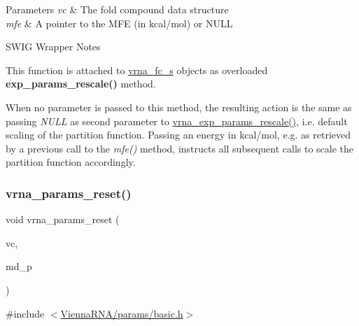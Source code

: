 \begin{DoxyParams}{Parameters}
{\em vc} & The fold compound data structure \\
\hline
{\em mfe} & A pointer to the M\+FE (in kcal/mol) or N\+U\+LL\\
\hline
\end{DoxyParams}
\begin{DoxyRefDesc}{S\+W\+I\+G Wrapper Notes}
\item[\mbox{\hyperlink{wrappers__wrappers000095}{S\+W\+I\+G Wrapper Notes}}]This function is attached to \mbox{\hyperlink{group__fold__compound_structvrna__fc__s}{vrna\+\_\+fc\+\_\+s}} objects as overloaded {\bfseries{exp\+\_\+params\+\_\+rescale()}} method.

When no parameter is passed to this method, the resulting action is the same as passing {\itshape N\+U\+LL} as second parameter to \mbox{\hyperlink{group__energy__parameters_gad607bc3a5b5da16400e2ca4ea5560233}{vrna\+\_\+exp\+\_\+params\+\_\+rescale()}}, i.\+e. default scaling of the partition function. Passing an energy in kcal/mol, e.\+g. as retrieved by a previous call to the {\itshape mfe()} method, instructs all subsequent calls to scale the partition function accordingly. \end{DoxyRefDesc}
\mbox{\label{group__energy__parameters_gac40dc82e48a72a97cfc58b9da08a7792}} 
\subsubsection{\texorpdfstring{vrna\_params\_reset()}{vrna\_params\_reset()}}
{\footnotesize\ttfamily void vrna\+\_\+params\+\_\+reset (\begin{DoxyParamCaption}\item[{\mbox{\hyperlink{group__fold__compound_ga1b0cef17fd40466cef5968eaeeff6166}{vrna\+\_\+fold\+\_\+compound\+\_\+t}} $\ast$}]{vc,  }\item[{\mbox{\hyperlink{group__model__details_ga1f8a10e12a0a1915f2a4eff0b28ea17c}{vrna\+\_\+md\+\_\+t}} $\ast$}]{md\+\_\+p }\end{DoxyParamCaption})}



{\ttfamily \#include $<$\mbox{\hyperlink{params_2basic_8h}{Vienna\+R\+N\+A/params/basic.\+h}}$>$}



